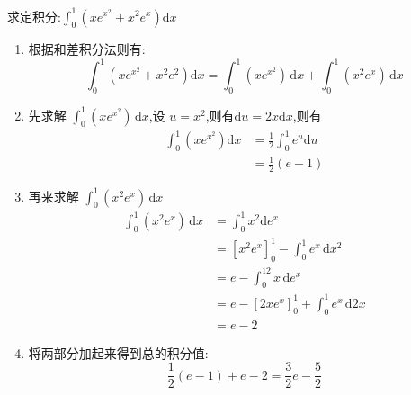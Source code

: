 \begin{questions}
	\question 求定积分:$\int_0^1\left(xe^{x^2} + x^2e^x\right)\mathrm{d}x$
	\begin{solution}
		\begin{enumerate}[label=\protect\circled{\arabic*}]
			\item 根据和差积分法则有:
			      \begin{equation*}
				      \int_0^1\left(xe^{x^2} + x^2e^2\right)\mathrm{d}x  = \int_0^1(xe^{x^2})\,\mathrm{d}x + \int_0^1(x^2e^x)\,\mathrm{d}x
			      \end{equation*}
			\item 先求解 $\int_0^1(xe^{x^2})\,\mathrm{d}x $,设 $u=x^2$,则有$\mathrm{d}u=2x\mathrm{d}x$,则有
			      \begin{align*}
				      \int_0^1(xe^{x^2})\mathrm{d}x & = \frac12\int_0^1e^u\mathrm{d}u \\
				                                    & = \frac12(e-1)
			      \end{align*}
			\item 再来求解 $\int_0^1(x^2e^x)\,\mathrm{d}x$
			      \begin{align*}
				      \int_0^1(x^2e^x)\,\mathrm{d}x & = \int_0^1 x^2\mathrm{d}e^x                                \\
				                                    & = \left[x^2e^x\right]_0^1 - \int_0^1e^x\,\mathrm{d}x^2     \\
				                                    & = e - \int_0^12x\,\mathrm{d}e^x                            \\
				                                    & = e - \left[ 2xe^x \right]_0^1 + \int_0^1e^x\,\mathrm{d}2x \\
				                                    & = e-2
			      \end{align*}
			\item 将两部分加起来得到总的积分值:
			      \begin{equation*}
				      \frac12(e-1) + e - 2 = \frac32e - \frac52
			      \end{equation*}
		\end{enumerate}
	\end{solution}
\end{questions}
